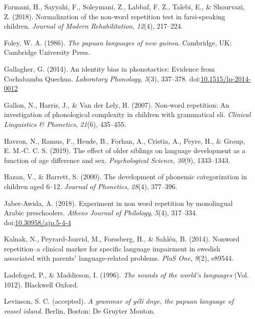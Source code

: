 \documentclass[english,,man,floatsintext]{apa6}
\begin{document}
\hypertarget{ref-farmani2018normalization}{}
Farmani, H., Sayyahi, F., Soleymani, Z., Labbaf, F. Z., Talebi, E., \&
Shourvazi, Z. (2018). Normalization of the non-word repetition test in
farsi-speaking children. \emph{Journal of Modern Rehabilitation},
\emph{12}(4), 217--224.

\hypertarget{ref-foley1986papuan}{}
Foley, W. A. (1986). \emph{The papuan languages of new guinea}.
Cambridge, UK: Cambridge University Press.

\hypertarget{ref-gallagher2014identity}{}
Gallagher, G. (2014). An identity bias in phonotactics: Evidence from
Cochabamba Quechua. \emph{Laboratory Phonology}, \emph{5}(3), 337--378.
doi:\href{https://doi.org/10.1515/lp-2014-0012}{10.1515/lp-2014-0012}

\hypertarget{ref-gallon2007non}{}
Gallon, N., Harris, J., \& Van der Lely, H. (2007). Non-word repetition:
An investigation of phonological complexity in children with grammatical
sli. \emph{Clinical Linguistics \& Phonetics}, \emph{21}(6), 435--455.

\hypertarget{ref-havron2019effect}{}
Havron, N., Ramus, F., Heude, B., Forhan, A., Cristia, A., Peyre, H., \&
Group, E. M.-C. C. S. (2019). The effect of older siblings on language
development as a function of age difference and sex. \emph{Psychological
Science}, \emph{30}(9), 1333--1343.

\hypertarget{ref-hazan2000development}{}
Hazan, V., \& Barrett, S. (2000). The development of phonemic
categorization in children aged 6--12. \emph{Journal of Phonetics},
\emph{28}(4), 377--396.

\hypertarget{ref-jabere2018xperiment}{}
Jaber-Awida, A. (2018). Experiment in non word repetition by monolingual
Arabic preschoolers. \emph{Athens Journal of Philology}, \emph{5}(4),
317--334.
doi:\href{https://doi.org/10.30958/ajp.5-4-4}{10.30958/ajp.5-4-4}

\hypertarget{ref-kalnak2014nonword}{}
Kalnak, N., Peyrard-Janvid, M., Forssberg, H., \& Sahlén, B. (2014).
Nonword repetition--a clinical marker for specific language impairment
in swedish associated with parents' language-related problems.
\emph{PloS One}, \emph{9}(2), e89544.

\hypertarget{ref-ladefoged1996sounds}{}
Ladefoged, P., \& Maddieson, I. (1996). \emph{The sounds of the world's
languages} (Vol. 1012). Blackwell Oxford.

\hypertarget{ref-levinsonYDgrammar}{}
Levinson, S. C. (accepted). \emph{A grammar of yélî dnye, the papuan
language of rossel island}. Berlin, Boston: De Gruyter Mouton.
\end{document}
